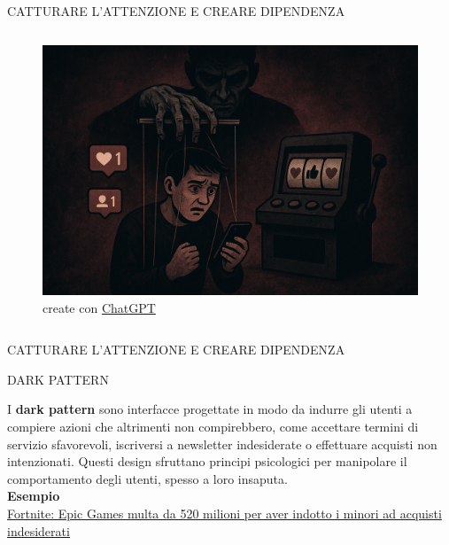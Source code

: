 \documentclass[aspectratio=1610]{beamer}
\begin{document}
\begin{frame}{CATTURARE L'ATTENZIONE E CREARE DIPENDENZA}
\begin{columns}
\begin{figure}
                \includegraphics[width=\linewidth]{img/dopamina_2.png}
                \caption{{create con \href{https://chatgpt.com/}{ChatGPT}}}
            \end{figure}
    \end{columns}
\end{frame}

\begin{frame}{CATTURARE L'ATTENZIONE E CREARE DIPENDENZA}
    \begin{alertblock}{DARK PATTERN}
        \begin{minipage}{0.98\linewidth}
            \justifying
            I \textbf{dark pattern} sono interfacce progettate in modo da indurre gli utenti a compiere 
            azioni che altrimenti non compirebbero, come accettare termini di servizio sfavorevoli, 
            iscriversi a newsletter indesiderate o effettuare acquisti non intenzionati. 
            Questi design sfruttano principi psicologici per manipolare il comportamento 
            degli utenti, spesso a loro insaputa.\\
            \bigskip
            \tiny{\textbf{Esempio}}\\
            \tiny{\href{https://multiplayer.it/notizie/fortnite-epic-games-multa-da-520-milioni-per-aver-indotto-i-minori-ad-acquisti-indesiderati.html}{Fortnite: Epic Games multa da 520 milioni per aver indotto i minori ad acquisti indesiderati}}
        \end{minipage}
    \end{alertblock}
\end{frame}
\end{document}
